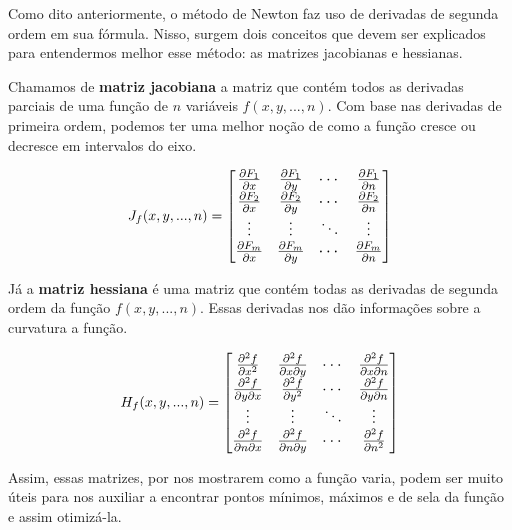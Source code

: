 Como dito anteriormente, o método de Newton faz uso de derivadas de segunda ordem em sua fórmula. Nisso, surgem dois conceitos que devem ser explicados para entendermos melhor esse método: as matrizes jacobianas e hessianas.

Chamamos de \textbf{matriz jacobiana} a matriz que contém todos as derivadas parciais de uma função de $n$ variáveis $f(x, y, ..., n)$. Com base nas derivadas de primeira ordem, podemos ter uma melhor noção de como a função cresce ou decresce em intervalos do eixo.

    \begin{equation}
        \large J_f(x,y,...,n) =
        \begin{bmatrix}
        \frac{\partial F_1}{\partial x} & \frac{\partial F_1}{\partial y} & \cdots & \frac{\partial F_1}{\partial n} \\
        \frac{\partial F_2}{\partial x} & \frac{\partial F_2}{\partial y} & \cdots & \frac{\partial F_2}{\partial n} \\
        \vdots & \vdots & \ddots & \vdots \\
        \frac{\partial F_m}{\partial x} & \frac{\partial F_m}{\partial y} & \cdots & \frac{\partial F_m}{\partial n}
        \end{bmatrix}
    \end{equation}

Já a \textbf{matriz hessiana} é uma matriz que contém todas as derivadas de segunda ordem da função $f(x, y, ..., n)$. Essas derivadas nos dão informações sobre a curvatura a função.

    \begin{equation}
        \large H_f(x,y,...,n) =
        \begin{bmatrix}
        \frac{\partial^2 f}{\partial x^2} & \frac{\partial^2 f}{\partial x\partial y} & \cdots & \frac{\partial^2 f}{\partial x \partial n} \\
        \frac{\partial^2 f}{\partial y \partial x} & \frac{\partial^2 f}{\partial y^2} & \cdots & \frac{\partial^2 f}{\partial y \partial n} \\
        \vdots & \vdots & \ddots & \vdots \\
        \frac{\partial^2 f}{\partial n \partial x} & \frac{\partial^2 f}{\partial n \partial y} & \cdots & \frac{\partial^2 f}{\partial n^2}
        \end{bmatrix}
    \end{equation}

Assim, essas matrizes, por nos mostrarem como a função varia, podem ser muito úteis para nos auxiliar a encontrar pontos mínimos, máximos e de sela da função e assim otimizá-la.

